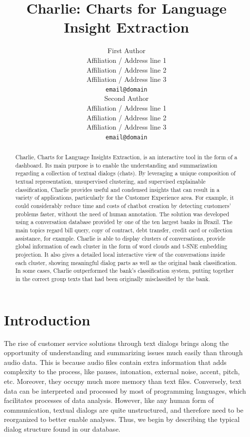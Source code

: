 \documentclass[11pt,a4paper]{article}
\title{Charlie: Charts for Language Insight Extraction}
\author{First Author \\
  Affiliation / Address line 1 \\
  Affiliation / Address line 2 \\
  Affiliation / Address line 3 \\
  \texttt{email@domain} \\\And
  Second Author \\
  Affiliation / Address line 1 \\
  Affiliation / Address line 2 \\
  Affiliation / Address line 3 \\
  \texttt{email@domain} \\}
\date{}
\begin{document}
\maketitle
\begin{abstract}
Charlie, Charts for Language Insights Extraction, is an interactive tool in the form of a dashboard. Its main purpose is to enable the understanding and summarization regarding a collection of textual dialogs (chats). By leveraging a unique composition of textual representation, unsupervised clustering, and supervised explainable classification, Charlie provides useful and condensed insights that can result in a variety of applications, particularly for the Customer Experience area. For example, it could considerably reduce time and costs of chatbot creation by detecting customers’ problems faster, without the need of human annotation. The solution was developed using a conversation database provided by one of the ten largest banks in Brazil. The main topics regard bill query, copy of contract, debt transfer, credit card or collection assistance, for example. Charlie is able to display clusters of conversations, provide global information of each cluster in the form of word clouds and t-SNE embedding projection. It also gives a detailed local interactive view of the conversations inside each cluster, showing meaningful dialog parts as well as the original bank classification. In some cases, Charlie outperformed the bank's classification system, putting together in the correct group texts that had been originally misclassified by the bank.

\end{abstract}


\section{Introduction}

The rise of customer service solutions through text dialogs brings along the opportunity of understanding and summarizing issues much easily than through audio data. This is because audio files contain extra information that adds complexity to the process, like pauses, intonation, external noise, accent, pitch, etc. Moreover, they occupy much more memory than text files. Conversely, text data can be interpreted and processed by most of programming languages, which facilitates processes of data analysis. However, like any human form of communication, textual dialogs are quite unstructured, and therefore need to be reorganized to better enable analyses. Thus, we begin by describing the typical dialog structure found in our database.
\end{document}
